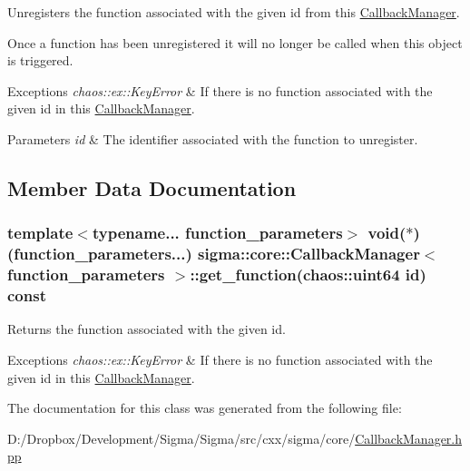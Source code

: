 Unregisters the function associated with the given id from this \hyperlink{classsigma_1_1core_1_1_callback_manager}{Callback\+Manager}. 

Once a function has been unregistered it will no longer be called when this object is triggered.


\begin{DoxyExceptions}{Exceptions}
{\em chaos\+::ex\+::\+Key\+Error} & If there is no function associated with the given id in this \hyperlink{classsigma_1_1core_1_1_callback_manager}{Callback\+Manager}.\\
\hline
\end{DoxyExceptions}

\begin{DoxyParams}{Parameters}
{\em id} & The identifier associated with the function to unregister. \\
\hline
\end{DoxyParams}


\subsection{Member Data Documentation}
\hypertarget{classsigma_1_1core_1_1_callback_manager_a3c36f3c32e2d6ea0f395f6bdd8775039}{}
\subsubsection[{get\+\_\+function}]{\setlength{\rightskip}{0pt plus 5cm}template$<$typename... function\+\_\+parameters$>$ void($\ast$)(function\+\_\+parameters...) {\bf sigma\+::core\+::\+Callback\+Manager}$<$ function\+\_\+parameters $>$\+::get\+\_\+function(chaos\+::uint64 id) const\hspace{0.3cm}{\ttfamily [inline]}}\label{classsigma_1_1core_1_1_callback_manager_a3c36f3c32e2d6ea0f395f6bdd8775039}


Returns the function associated with the given id. 


\begin{DoxyExceptions}{Exceptions}
{\em chaos\+::ex\+::\+Key\+Error} & If there is no function associated with the given id in this \hyperlink{classsigma_1_1core_1_1_callback_manager}{Callback\+Manager}. \\
\hline
\end{DoxyExceptions}


The documentation for this class was generated from the following file\+:\begin{DoxyCompactItemize}
\item 
D\+:/\+Dropbox/\+Development/\+Sigma/\+Sigma/src/cxx/sigma/core/\hyperlink{_callback_manager_8hpp}{Callback\+Manager.\+hpp}\end{DoxyCompactItemize}
